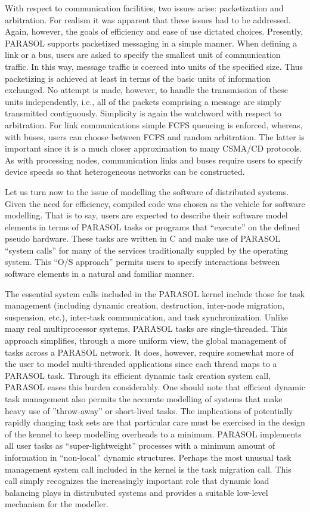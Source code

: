 \documentclass[11pt]{article}
\begin{document}
With respect to communication facilities, two issues arise:  packetization and arbitration. For realism
it was apparent that these issues had to be addressed. Again, however, the goals of efficiency and
ease of use dictated choices. Presently, PARASOL supports packetized messaging in a simple
manner.  When defining a link or a bus, users are asked to specify the smallest unit of
communication traffic. In this way, message traffic is coerced into units of the specified size.  Thus
packetizing is achieved at least in terms of the basic units of information exchanged. No attempt is
made, however, to handle the transmission of these units independently, i.e., all of the packets
comprising a message are simply transmitted contiguously. Simplicity is again the watchword
with respect to arbitration. For link communications simple FCFS queueing is enforced, whereas,
with buses, users can choose between FCFS and random arbitration. The latter is important since
it is a much closer approximation to many CSMA/CD protocols. As with processing nodes,
communication links and buses require users to specify device speeds so that heterogeneous
networks can be constructed.

Let us turn now to the issue of modelling the software of distributed systems. Given the need for
efficiency, compiled code was chosen as the vehicle for software modelling. That is to say, users
are expected to describe their software model elements in terms of PARASOL tasks or programs
that ``execute'' on the defined pseudo hardware. These tasks are  written in C and make use of
PARASOL ``system calls'' for many of the services traditionally suppled by the operating system.
This ``O/S approach'' permits users to specify interactions between software elements in a natural
and familiar manner.

The essential system calls included in the PARASOL kernel include those for task management
(including dynamic creation, destruction, inter-node migration, suspension, etc.), inter-task
communication, and task synchronization. Unlike many real multiprocessor systems, PARASOL
tasks are single-threaded. This approach simplifies, through a more uniform view, the global
management of tasks across a PARASOL network. It does, however, require somewhat more of
the user to model multi-threaded applications since each thread maps to a PARASOL task. Through
its efficient dynamic task creation system call, PARASOL eases this burden considerably. One
should note that efficient dynamic task management also permits the accurate  modelling of systems
that make heavy use of ''throw-away'' or short-lived tasks. The implications of potentially rapidly
changing task sets are that particular care must be exercised in the design of the kennel to keep
modelling overheads to a minimum. PARASOL implements all user tasks as ``super-lightweight''
processes with a minimum amount of information in ``non-local'' dynamic structures. Perhaps the
most unusual task management system call included in the kernel is the task migration call. This
call simply recognizes the increasingly important role that dynamic load balancing plays in
distrubuted systems and provides a suitable low-level mechanism for the modeller.
\end{document}
